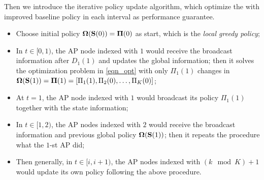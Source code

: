 Then we introduce the iterative policy update algorithm, which optimize the 
with improved baseline policy in each interval as performance guarantee.
\begin{itemize}
    \item Choose initial policy $\boldsymbol{\Omega}(\mathbf{S}(0)) = \boldsymbol{\Pi}(0)$ as start, which is the \emph{local greedy policy};
    \item In $t\in[0, 1)$, the AP node indexed with $1$ would receive the broadcast information after $D_1(1)$ and updates the global information; then it solves the optimization problem in \ref{eqn_opt} with only $\Pi_{1}(1)$ changes in $\boldsymbol{\Omega}(\mathbf{S}(1)) = \boldsymbol{\Pi}(1) = [\Pi_{1}(1), \Pi_{2}(0), \dots, \Pi_{K}(0)]$;
    \item At $t=1$, the AP node indexed with $1$ would broadcast its policy $\Pi_{1}(1)$ together with the state information;
    \item In $t\in[1, 2)$, the AP nodes indexed with $2$ would receive the broadcast information and previous global policy $\boldsymbol{\Omega}(\mathbf{S}(1))$; then it repeats the procedure what the $1$-st AP did;
    \item Then generally, in $t\in[{i}, {i+1})$, the AP nodes indexed with $(k \mod K)+1$ would update its own policy following the above procedure.
\end{itemize}


